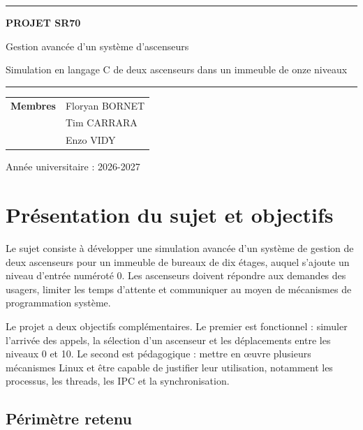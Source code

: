 \documentclass[11pt,a4paper]{article}
\begin{document}
\hypersetup{pageanchor=false}
\begin{titlepage}
  \centering
  {\color{bleu}\rule{\textwidth}{1.2pt}}\par
  \vspace{0.7cm}
  {\Huge\bfseries\color{bleu} PROJET SR70\par}
  \vspace{0.5cm}
  {\LARGE Gestion avancée d'un système d'ascenseurs\par}
  \vspace{0.6cm}
  {\large Simulation en langage C de deux ascenseurs dans un immeuble de onze niveaux\par}
  \vspace{0.7cm}
  {\color{bleu}\rule{\textwidth}{1.2pt}}\par
  \vspace{2.1cm}
  \begin{tabular}{>{\bfseries}p{4cm}p{8cm}}
    Membres & Floryan BORNET\\
             & Tim CARRARA\\
             & Enzo VIDY\\[0.35cm]
  \end{tabular}
  \vfill
  {\large Année universitaire : 2026-2027\par}
\end{titlepage}
\hypersetup{pageanchor=true}

\tableofcontents
\newpage

\section{Présentation du sujet et objectifs}

Le sujet consiste à développer une simulation avancée d'un système de gestion de deux ascenseurs pour un immeuble de bureaux de dix étages, auquel s'ajoute un niveau d'entrée numéroté 0. Les ascenseurs doivent répondre aux demandes des usagers, limiter les temps d'attente et communiquer au moyen de mécanismes de programmation système.

Le projet a deux objectifs complémentaires. Le premier est fonctionnel : simuler l'arrivée des appels, la sélection d'un ascenseur et les déplacements entre les niveaux 0 et 10. Le second est pédagogique : mettre en œuvre plusieurs mécanismes Linux et être capable de justifier leur utilisation, notamment les processus, les threads, les IPC et la synchronisation.

\subsection{Périmètre retenu}
\end{document}
